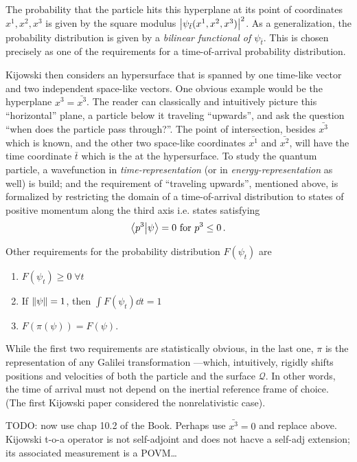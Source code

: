 The probability that the particle hits this hyperplane at its point of coordinates $x^1, x^2, x^3$
is given by the square modulus $\abs{\psi_{\bar{t}}(x^1, x^2, x^3)}^2$. As a generalization,
the probability distribution is given by a \emph{bilinear functional of $\psi_{\bar{t}}$}.
This is chosen precisely as one of the requirements for a time-of-arrival probability distribution.

Kijowski then considers an hypersurface that is spanned by one time-like vector and two independent
space-like vectors. One obvious example would be the hyperplane $x^3 = \bar{x^3}$.
The reader can classically and intuitively picture this ``horizontal'' plane,
a particle below it traveling ``upwards'', and ask the question
``when does the particle pass through?''. The point of intersection,
besides $\bar{x^3}$ which is known, and the other two space-like coordinates $\bar{x^1}$ and $\bar{x^2}$,
will have the time coordinate $\bar{t}$ which is the  at the hypersurface.
To study the quantum particle, a wavefunction in \emph{time-representation}
(or in \emph{energy-representation} as well) is build;
and the requirement of ``traveling upwards'',
mentioned above, is formalized by restricting the domain of a time-of-arrival
distribution to states of positive momentum along the third axis i.e. states satisfying
\begin{equation}
  \braket{p^3}{\psi} = 0 \text{ for } p^3 \leq 0 \,\text{.}
\end{equation}

Other requirements for the probability distribution $F(\psi_t)$ are
\begin{enumerate}
  \item $F(\psi_t) \ge 0 \; \forall t$
  \item If $\norm{\psi} = 1$, then $\int F(\psi_t) \dd t = 1$
  \item $F(\pi(\psi)) = F(\psi)$.
\end{enumerate}
While the first two requirements are statistically obvious, in the last one, $\pi$
is the representation of any Galilei transformation ---which, intuitively, rigidly shifts
positions and velocities of both the particle and the surface $\mathcal{Q}$. In other words,
the time of arrival must not depend on the inertial reference frame of choice.
(The first Kijowski paper considered the nonrelativistic case).

TODO: now use chap 10.2 of the Book. Perhaps use $\bar{x^3}=0$ and replace above. Kijowski
t-o-a operator is not self-adjoint and does not hacve a self-adj extension; its associated
measurement is a POVM\dots

